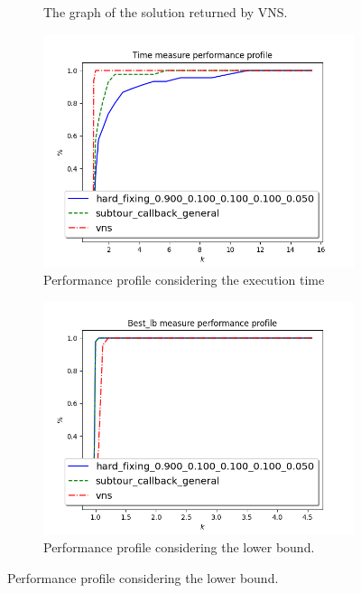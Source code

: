 \begin{figure}[!h]
\begin{subfigure}{.5\columnwidth}
		\caption{The graph of the solution returned by VNS.}
		\label{fig:d2103_16}
	\end{subfigure}
	\begin{subfigure}{.5\columnwidth}
		\centering
		\includegraphics[width=\columnwidth]{../res/Lsubtour_hardfixing_vns_time.png}
		\caption{Performance profile considering the execution time}
		\label{fig:Lsubtour_hardfixing_vns_time}
	\end{subfigure}
	\begin{subfigure}{.5\columnwidth}
		\centering
		\includegraphics[width=\columnwidth]{../res/Lsubtour_hardfixing_vns_lb.png}
		\caption{Performance profile considering the lower bound.}
		\label{fig:Lsubtour_hardfixing_vns_lb}
	\end{subfigure}
\end{figure}

